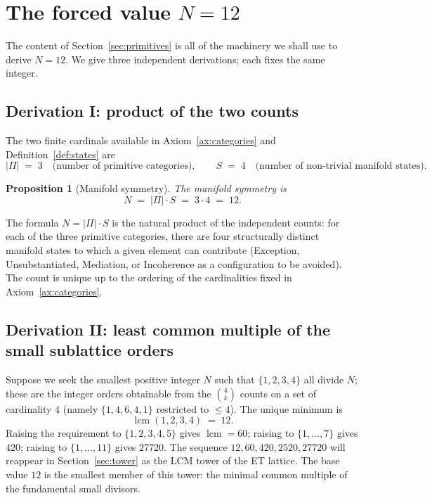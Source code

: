 \documentclass[11pt,a4paper]{article}
\newtheorem{proposition}[theorem]{Proposition}
\theoremstyle{definition}
\theoremstyle{remark}
\DeclareMathOperator{\lcm}{lcm}
\begin{document}
\section{The forced value \texorpdfstring{$N=12$}{N=12}}\label{sec:N12}

The content of Section~\ref{sec:primitives} is all of the machinery we shall use to derive $N=12$. We give three independent derivations; each fixes the same integer.

\subsection{Derivation I: product of the two counts}

The two finite cardinals available in Axiom~\ref{ax:categories} and Definition~\ref{def:states} are
\[
|\Pi| \;=\; 3 \quad\text{(number of primitive categories)}, \qquad S \;=\; 4 \quad\text{(number of non-trivial manifold states)}.
\]

\begin{proposition}[Manifold symmetry]\label{prop:N12}
The \emph{manifold symmetry} is
\[
N \;=\; |\Pi|\cdot S \;=\; 3\cdot 4 \;=\; 12.
\]
\end{proposition}

The formula $N = |\Pi|\cdot S$ is the natural product of the independent counts: for each of the three primitive categories, there are four structurally distinct manifold states to which a given element can contribute (Exception, Unsubstantiated, Mediation, or Incoherence as a configuration to be avoided). The count is unique up to the ordering of the cardinalities fixed in Axiom~\ref{ax:categories}.

\subsection{Derivation II: least common multiple of the small sublattice orders}

Suppose we seek the smallest positive integer $N$ such that $\{1,2,3,4\}$ all divide $N$; these are the integer orders obtainable from the $\binom{4}{k}$ counts on a set of cardinality $4$ (namely $\{1,4,6,4,1\}$ restricted to $\le 4$). The unique minimum is
\[
\lcm(1,2,3,4) \;=\; 12.
\]
Raising the requirement to $\{1,2,3,4,5\}$ gives $\lcm=60$; raising to $\{1,\ldots,7\}$ gives $420$; raising to $\{1,\ldots,11\}$ gives $27720$. The sequence $12,60,420,2520,27720$ will reappear in Section~\ref{sec:tower} as the LCM tower of the ET lattice. The base value $12$ is the smallest member of this tower: the minimal common multiple of the fundamental small divisors.
\end{document}
